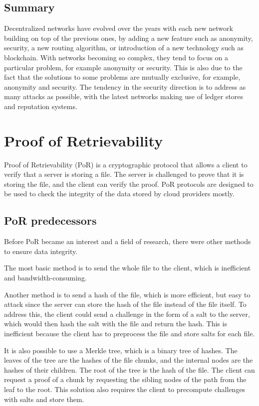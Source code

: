 \subsection{Summary}

Decentralized networks have evolved over the years with each new network building on top of the previous ones,
by adding a new feature such as anonymity, security, a new routing algorithm, or introduction of a new technology
such as blockchain.
With networks becoming so complex, they tend to focus on a particular problem,
for example anonymity or security.
This is also due to the fact that the solutions to some problems are mutually exclusive,
for example, anonymity and security.
The tendency in the security direction is to address as many attacks as possible,
with the latest networks making use of ledger stores and reputation systems.

\section{Proof of Retrievability}
\label{section:por}

Proof of Retrievability (PoR) \cite{porfirst} is a cryptographic protocol that
allows a client to verify that a server is storing a file.
The server is challenged to prove that it is storing the file, and the client
can verify the proof.
PoR protocols are designed to be used to check the integrity of the data stored by cloud providers mostly.

\subsection{PoR predecessors}

Before PoR became an interest and a field of research, there were other methods to ensure data integrity.

The most basic method is to send the whole file to the client, which is inefficient and bandwidth-consuming.

Another method is to send a hash of the file, which is more efficient, but easy to attack since
the server can store the hash of the file instead of the file itself.
To address this, the client could send a challenge in the form of a salt to the server,
which would then hash the salt with the file and return the hash.
This is inefficient because the client has to preprocess the file and store salts for each file.

It is also possible to use a Merkle tree, which is a binary tree of hashes.
The leaves of the tree are the hashes of the file chunks, and the internal nodes are the hashes of their children.
The root of the tree is the hash of the file.
The client can request a proof of a chunk by requesting the sibling nodes of the path from the leaf to the root.
This solution also requires the client to precompute challenges with salts and store them.


